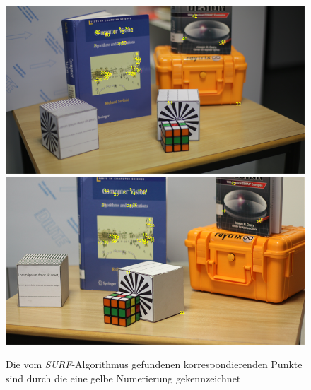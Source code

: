 \begin{figure}[!htb]
	\includegraphics[width=\linewidth]{images/2Cameras2ResolutionsSURFLeft.png}
	\label{fig:awesome_image1}
	\endminipage\hfill
	\includegraphics[width=\linewidth]{images/2Cameras2ResolutionsSURFRight.png}
	\label{fig:awesome_image2}
	\endminipage\hfill
	\caption{Die vom \textit{SURF}-Algorithmus gefundenen korrespondierenden Punkte sind durch die eine gelbe Numerierung gekennzeichnet}
\end{figure}


